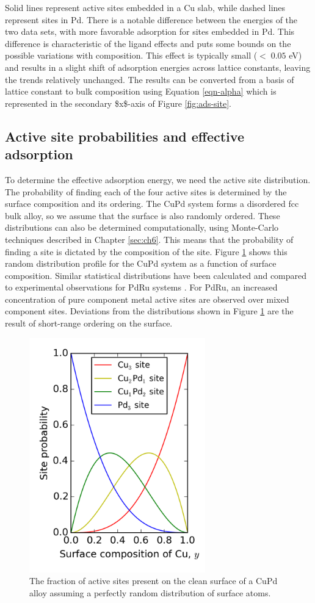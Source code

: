 \documentclass[12pt]{cmuthesis}
\begin{document}
Solid lines represent active sites embedded in a Cu slab, while dashed lines represent sites in Pd. There is a notable difference between the energies of the two data sets, with more favorable adsorption for sites embedded in Pd. This difference is characteristic of the ligand effects and puts some bounds on the possible variations with composition. This effect is typically small (\(< \; 0.05\) eV) and results in a slight shift of adsorption energies across lattice constants, leaving the trends relatively unchanged. The results can be converted from a basis of lattice constant to bulk composition using Equation \eqref{eqn-alpha} which is represented in the secondary \$x\$-axis of Figure \ref{fig:ads-site}.

\subsection{Active site probabilities and effective adsorption}
\label{sec:orgf4eb3ef}
To determine the effective adsorption energy, we need the active site distribution. The probability of finding each of the four active sites is determined by the surface composition and its ordering. The CuPd system forms a disordered fcc bulk alloy, so we assume that the surface is also randomly ordered. These distributions can also be determined computationally, using Monte-Carlo techniques described in Chapter \ref{sec:ch6}. This means that the probability of finding a site is dictated by the composition of the site. Figure \ref{fig-rnd} shows this random distribution profile for the CuPd system as a function of surface composition. Similar statistical distributions have been calculated and compared to experimental observations for PdRu systems \cite{hartmann-2009-surfac-pdru}. For PdRu, an increased concentration of pure component metal active sites are observed over mixed component sites. Deviations from the distributions shown in Figure \ref{fig-rnd} are the result of short-range ordering on the surface.

\begin{figure}[h]
\centering
\includegraphics[width=3in]{./images/rndprob.png}
\caption{The fraction of active sites present on the clean surface of a CuPd alloy assuming a perfectly random distribution of surface atoms. \label{fig-rnd}}
\end{figure}
\end{document}
